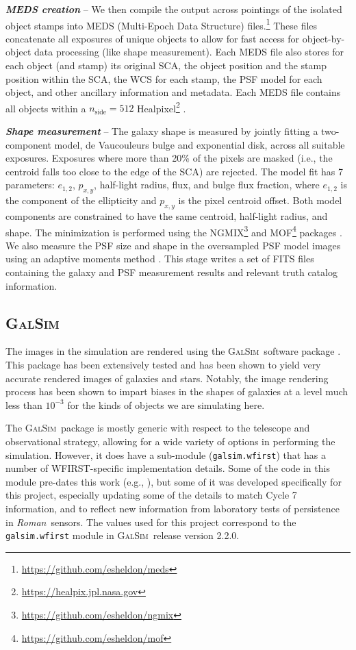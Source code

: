 \documentclass[usenatbib]{mnras}
\newcommand{\galsim}{\textsc{GalSim}}
\newcommand{\wfirst}{{\slshape Roman}}
\begin{document}
\textbf{\textit{MEDS creation}} -- We then compile the output across pointings of the isolated object stamps into MEDS (Multi-Epoch Data Structure) files.\footnote{\url{https://github.com/esheldon/meds}}
These files concatenate all exposures of unique objects to allow for fast access for object-by-object data processing (like shape measurement). 
Each MEDS file also stores for each object (and stamp) its original SCA, the object position and the stamp position within the SCA, the WCS for each stamp, the PSF model for each object, and other ancillary information and metadata.
Each MEDS file contains all objects within a $n_{\textrm{side}}=512$ Healpixel\footnote{\url{https://healpix.jpl.nasa.gov}} \citep{2005ApJ...622..759G,Zonca2019}.

\textbf{\textit{Shape measurement}} -- 
The galaxy shape is measured by jointly fitting a two-component model, de Vaucouleurs bulge and exponential disk, across all suitable exposures. 
Exposures where more than 20\% of the pixels are masked (i.e., the centroid falls too close to the edge of the SCA) are rejected. 
The model fit has 7 parameters: $e_{1,2}$, $p_{x,y}$, half-light radius, flux, and bulge flux fraction, where $e_{1,2}$ is the component of the ellipticity and $p_{x,y}$ is the pixel centroid offset. Both model components are constrained to have the same centroid, half-light radius, and shape.
The minimization is performed using the \textsc{NGMIX}\footnote{\url{https://github.com/esheldon/ngmix}} and \textsc{MOF}\footnote{\url{https://github.com/esheldon/mof}} packages \citep{2014MNRAS.444L..25S}. 
We also measure the PSF size and shape in the oversampled PSF model images using an adaptive moments method \citep{2003MNRAS.343..459H}. 
This stage writes a set of FITS files containing the galaxy and PSF measurement results and relevant truth catalog information.

\subsection{\galsim}

The images in the simulation are rendered using the \galsim\ software package \citep{Rowe15}.  
This package has been extensively tested and has been shown to yield very accurate rendered images of galaxies and stars.
Notably, the image rendering process has been shown to impart biases in the shapes of galaxies at a level much less than $10^{-3}$ for the kinds of objects we are simulating here.  

The \galsim\ package is mostly generic with respect to the telescope and observational strategy, allowing for a wide variety of options in performing the simulation.
However, it does have a sub-module (\texttt{galsim.wfirst}) that has a number of WFIRST-specific implementation details.
Some of the code in this module pre-dates this work (e.g., \cite{2016PASP..128i5001K}), but some of it was developed specifically for this project, especially updating some of the details to match Cycle 7 information, and to reflect new information from laboratory tests of persistence in \wfirst\ sensors.  
The values used for this project correspond to the \texttt{galsim.wfirst} module in \galsim\ release version 2.2.0.
\end{document}

